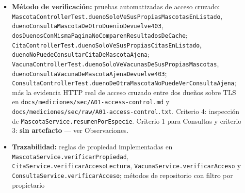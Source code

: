\documentclass[
  spanish,
]{article}
\begin{document}
\begin{itemize}
\item
  \textbf{Método de verificación:} pruebas automatizadas de acceso
  cruzado:
  \texttt{Mascota\allowbreak{}Controller\allowbreak{}Test.\allowbreak{}dueno\allowbreak{}Solo\allowbreak{}Ve\allowbreak{}Sus\allowbreak{}Propias\allowbreak{}Mascotas\allowbreak{}En\allowbreak{}Listado},
  \texttt{dueno\allowbreak{}Consulta\allowbreak{}Mascota\allowbreak{}De\allowbreak{}Otro\allowbreak{}Duenio\allowbreak{}Devuelve403},
  \texttt{dos\allowbreak{}Duenos\allowbreak{}Con\allowbreak{}Misma\allowbreak{}Pagina\allowbreak{}No\allowbreak{}Comparen\allowbreak{}Resultados\allowbreak{}De\allowbreak{}Cache};
  \texttt{Cita\allowbreak{}Controller\allowbreak{}Test.\allowbreak{}dueno\allowbreak{}Solo\allowbreak{}Ve\allowbreak{}Sus\allowbreak{}Propias\allowbreak{}Citas\allowbreak{}En\allowbreak{}Listado},
  \texttt{dueno\allowbreak{}No\allowbreak{}Puede\allowbreak{}Consultar\allowbreak{}Cita\allowbreak{}De\allowbreak{}Mascota\allowbreak{}Ajena};
  \texttt{Vacuna\allowbreak{}Controller\allowbreak{}Test.\allowbreak{}dueno\allowbreak{}Solo\allowbreak{}Ve\allowbreak{}Vacunas\allowbreak{}De\allowbreak{}Sus\allowbreak{}Propias\allowbreak{}Mascotas},
  \texttt{dueno\allowbreak{}Consulta\allowbreak{}Vacuna\allowbreak{}De\allowbreak{}Mascota\allowbreak{}Ajena\allowbreak{}Devuelve403};
  \texttt{Consulta\allowbreak{}Controller\allowbreak{}Test.\allowbreak{}dueno\allowbreak{}De\allowbreak{}Otra\allowbreak{}Mascota\allowbreak{}No\allowbreak{}Puede\allowbreak{}Ver\allowbreak{}Consulta\allowbreak{}Ajena};
  más la evidencia HTTP real de acceso cruzado entre dos dueños sobre
  TLS en \texttt{docs/\allowbreak{}mediciones/\allowbreak{}sec/\allowbreak{}A01-\allowbreak{}access-\allowbreak{}control.\allowbreak{}md} y
  \texttt{docs/\allowbreak{}mediciones/\allowbreak{}sec/\allowbreak{}raw/\allowbreak{}A01-\allowbreak{}access-\allowbreak{}control.\allowbreak{}txt}. Criterio 4:
  inspección de \texttt{Mascota\allowbreak{}Service.\allowbreak{}resumen\allowbreak{}Por\allowbreak{}Especie}. Criterio 1
  para Consultas y criterio 3: \textbf{sin artefacto} --- ver
  Observaciones.
\item
  \textbf{Trazabilidad:} reglas de propiedad implementadas en
  \texttt{Mascota\allowbreak{}Service.\allowbreak{}verificar\allowbreak{}Propiedad},
  \texttt{Cita\allowbreak{}Service.\allowbreak{}verificar\allowbreak{}Acceso\allowbreak{}Lectura},
  \texttt{Vacuna\allowbreak{}Service.\allowbreak{}verificar\allowbreak{}Acceso} y
  \texttt{Consulta\allowbreak{}Service.\allowbreak{}verificar\allowbreak{}Acceso}; métodos de repositorio con
  filtro por propietario

\end{itemize}
\end{document}

